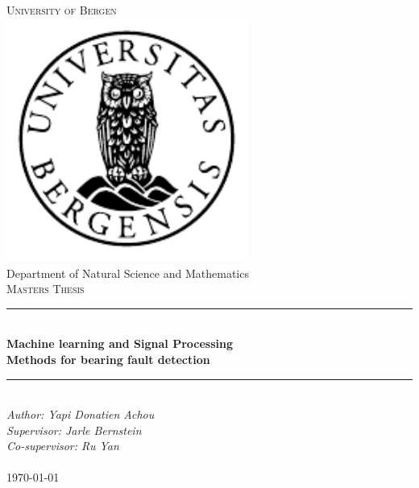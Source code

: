 \documentclass[../Main/thesis.tex]{subfiles}
\begin{document}

\newcommand{\HRule}{\rule{\linewidth}{0.5mm}}

\begin{titlepage}
\begin{center}
\textsc{\Huge University of Bergen}\\[0.4cm]
\includegraphics[width=8cm]{../fig/uib} \\[0.5cm]

\large Department of Natural Science and Mathematics\\[0.7cm]
\textsc{\huge Masters Thesis}\\[0.4cm]
\HRule \\[0.4cm]
{ \huge \bfseries Machine learning and Signal Processing    \\  Methods for bearing fault detection}\\[0.5cm]
\HRule \\[1.0cm]

\emph{Author: Yapi Donatien Achou}\\
\emph{Supervisor: Jarle Bernstein}\\
\emph{Co-supervisor: Ru Yan}\\

\paragraph*{}
\end{center}
\vfill
\begin{center}
{\large \today}
\end{center}
\end{titlepage}
\end{document}
